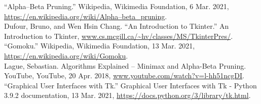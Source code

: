 \documentclass[fontsize=11pt]{article}
\begin{document}
\hspace*{5mm}“Alpha–Beta Pruning.” Wikipedia, Wikimedia Foundation, 6 Mar. 2021,
\url{https://en.wikipedia.org/wiki/Alpha–beta\_pruning}.\\

Dufour, Bruno, and Wen Hsin Chang. “An Introduction to Tkinter.” An Introduction to Tkinter, \url{www.cs.mcgill.ca/~hv/classes/MS/TkinterPres/}.\\

“Gomoku.” Wikipedia, Wikimedia Foundation, 13 Mar. 2021, 
\url{https://en.wikipedia.org/wiki/Gomoku}.\\

Lague, Sebastian. Algorithms Explained – Minimax and Alpha-Beta Pruning. YouTube, YouTube, 20 Apr. 2018, \url{www.youtube.com/watch?v=l-hh51ncgDI}.\\

“Graphical User Interfaces with Tk.” Graphical User Interfaces with Tk - Python 3.9.2 documentation, 13 Mar. 2021, \url{https://docs.python.org/3/library/tk.html}.

\end{document}
